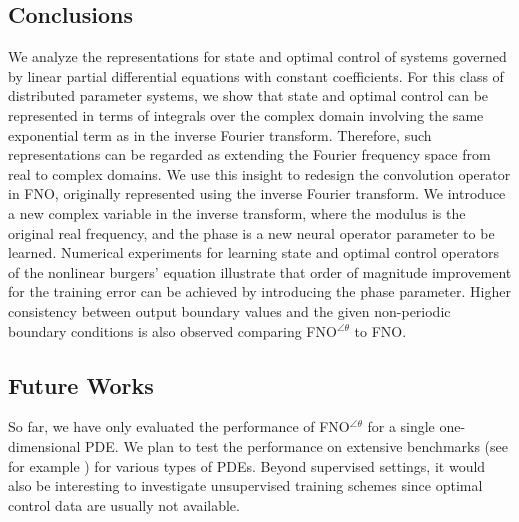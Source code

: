 \documentclass[letterpaper, 10 pt, conference]{ieeeconf}  %
\begin{document}
\subsection{Conclusions}
We analyze the representations for state and optimal control of systems governed by linear partial differential equations with constant coefficients.
For this class of distributed parameter systems, we show that state and optimal control can be represented in terms of integrals over the complex domain involving the same exponential term as in the inverse Fourier transform. Therefore, such representations can be regarded as extending the Fourier frequency space from real to complex domains.
We use this insight to redesign the convolution operator in FNO, originally represented using the inverse Fourier transform. 
We introduce a new complex variable in the inverse transform, where the modulus is the original real frequency, and the phase is a new neural operator parameter to be learned. 
Numerical experiments for learning state and optimal control operators of the nonlinear burgers' equation illustrate that order of magnitude improvement for the training error can be achieved by introducing the phase parameter.
Higher consistency between output boundary values and the given non-periodic boundary conditions is also observed comparing FNO$^{\angle \theta}$ to FNO.

\subsection{Future Works}
So far, we have only evaluated the performance of FNO$^{\angle \theta}$ for a single one-dimensional PDE. We plan to test the performance on extensive benchmarks (see for example \cite{takamoto2022pdebench}) for various types of PDEs. Beyond supervised settings, it would also be interesting to investigate unsupervised training schemes since optimal control data are usually not available.








\end{document}
